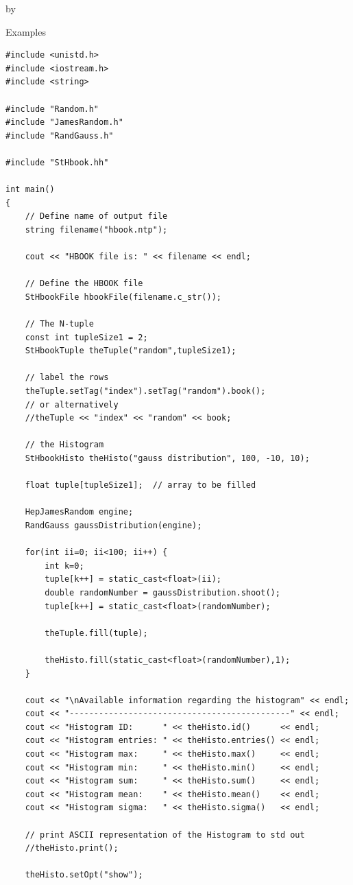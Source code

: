 \documentclass[twoside]{article}
\newcommand{\entrylabel}[1]{\mbox{\textbf{{#1}}}\hfil}%
\newenvironment{entry}
{\begin{list}{}%
    {\renewcommand{\makelabel}{\entrylabel}%
     \setlength{\labelwidth}{90pt}%
     \setlength{\leftmargin}{\labelwidth}
     \advance\leftmargin by \labelsep%
      }%
    }%
  {\end{list}}
\newcommand{\Entrylabel}[1]%
{\raisebox{0pt}[1ex][0pt]{\makebox[\labelwidth][l]%
    {\parbox[t]{\labelwidth}{\hspace{0pt}\textbf{{#1}}}}}}
\newenvironment{Entry}%
{\renewcommand{\entrylabel}{\Entrylabel}\begin{entry}}%
  {\end{entry}}
\begin{document}
\begin{description}
\begin{Entry}
\item[Examples]
{\footnotesize
\begin{verbatim}
#include <unistd.h>
#include <iostream.h>
#include <string>

#include "Random.h"
#include "JamesRandom.h"
#include "RandGauss.h"

#include "StHbook.hh"

int main()
{
    // Define name of output file
    string filename("hbook.ntp");

    cout << "HBOOK file is: " << filename << endl;

    // Define the HBOOK file
    StHbookFile hbookFile(filename.c_str());

    // The N-tuple
    const int tupleSize1 = 2;
    StHbookTuple theTuple("random",tupleSize1);

    // label the rows
    theTuple.setTag("index").setTag("random").book();
    // or alternatively
    //theTuple << "index" << "random" << book;

    // the Histogram
    StHbookHisto theHisto("gauss distribution", 100, -10, 10);

    float tuple[tupleSize1];  // array to be filled
    
    HepJamesRandom engine;
    RandGauss gaussDistribution(engine);
    
    for(int ii=0; ii<100; ii++) {
        int k=0;
        tuple[k++] = static_cast<float>(ii);
        double randomNumber = gaussDistribution.shoot();
        tuple[k++] = static_cast<float>(randomNumber);
        
        theTuple.fill(tuple);

        theHisto.fill(static_cast<float>(randomNumber),1);
    }

    cout << "\nAvailable information regarding the histogram" << endl;
    cout << "---------------------------------------------" << endl;
    cout << "Histogram ID:      " << theHisto.id()      << endl;
    cout << "Histogram entries: " << theHisto.entries() << endl;
    cout << "Histogram max:     " << theHisto.max()     << endl;
    cout << "Histogram min:     " << theHisto.min()     << endl;
    cout << "Histogram sum:     " << theHisto.sum()     << endl;
    cout << "Histogram mean:    " << theHisto.mean()    << endl;
    cout << "Histogram sigma:   " << theHisto.sigma()   << endl;

    // print ASCII representation of the Histogram to std out
    //theHisto.print();

    theHisto.setOpt("show");


\end{verbatim}}
\end{Entry}
\end{description}
\end{document}
